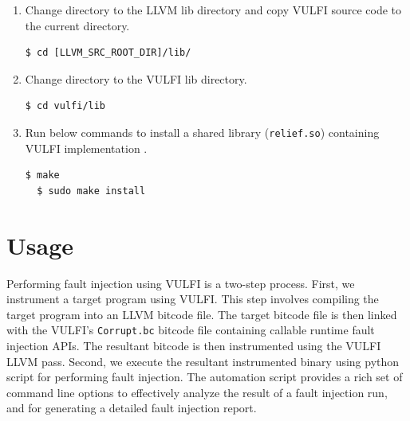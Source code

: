 \documentclass[12pt,a4paper]{article}
\begin{document}
\begin{enumerate}
 \item Change directory to the LLVM lib directory and copy VULFI source code to 
 the current directory.
 \begin{Verbatim}[fontsize=\relsize{-1},frame=single,framerule=0.1mm]
 $ cd [LLVM_SRC_ROOT_DIR]/lib/ 
 \end{Verbatim} 
 
 \item Change directory to the VULFI lib directory.
 \begin{Verbatim}[fontsize=\relsize{-1},frame=single,framerule=0.1mm]
 $ cd vulfi/lib 
 \end{Verbatim}
 
 \item Run below commands to install a shared library (\texttt{relief.so}) containing VULFI implementation .
 \begin{Verbatim}[fontsize=\relsize{-1},frame=single,framerule=0.1mm]
  $ make 
  $ sudo make install 
 \end{Verbatim}  
\end{enumerate}


% 

\section{Usage}
\label{usage}
Performing fault injection using VULFI is a two-step process.
%
First, we instrument a target program using VULFI.
%
This step involves compiling the target program into an LLVM
bitcode file.
%
The target bitcode file is then linked with the VULFI's \texttt{Corrupt.bc}
bitcode file containing callable runtime fault injection APIs. 
%
The resultant bitcode is then instrumented using the VULFI LLVM pass.
%
Second, we execute the resultant instrumented binary using python script
for performing fault injection.
%
The automation script provides a rich set of command line options
to effectively analyze the result of a fault injection run, and for generating a
detailed fault injection report. 
\end{document}
